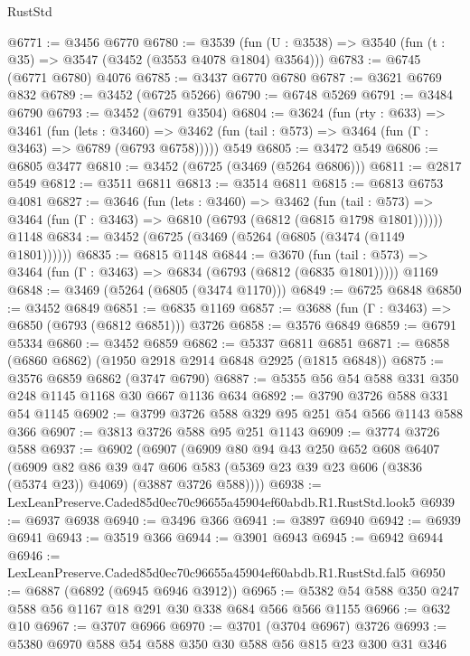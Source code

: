 \begin{lexlean}{RustStd}
\begin{coremodule}
@6771 := @3456 @6770
@6780 := @3539 (fun (U : @3538) => @3540 (fun (t : @35) => @3547 (@3452 (@3553 @4078 @1804) @3564)))
@6783 := @6745 (@6771 @6780) @4076
@6785 := @3437 @6770 @6780
@6787 := @3621 @6769 @832
@6789 := @3452 (@6725 @5266)
@6790 := @6748 @5269
@6791 := @3484 @6790
@6793 := @3452 (@6791 @3504)
@6804 := @3624
    (fun (rty : @633) =>
    @3461
      (fun (lets : @3460) =>
      @3462 (fun (tail : @573) => @3464 (fun (Γ : @3463) => @6789 (@6793 @6758)))))
    @549
@6805 := @3472 @549
@6806 := @6805 @3477
@6810 := @3452 (@6725 (@3469 (@5264 @6806)))
@6811 := @2817 @549
@6812 := @3511 @6811
@6813 := @3514 @6811
@6815 := @6813 @6753 @4081
@6827 := @3646
    (fun (lets : @3460) =>
    @3462
      (fun (tail : @573) => @3464 (fun (Γ : @3463) => @6810 (@6793 (@6812 (@6815 @1798 @1801))))))
    @1148
@6834 := @3452 (@6725 (@3469 (@5264 (@6805 (@3474 (@1149 @1801))))))
@6835 := @6815 @1148
@6844 := @3670
    (fun (tail : @573) => @3464 (fun (Γ : @3463) => @6834 (@6793 (@6812 (@6835 @1801)))))
    @1169
@6848 := @3469 (@5264 (@6805 (@3474 @1170)))
@6849 := @6725 @6848
@6850 := @3452 @6849
@6851 := @6835 @1169
@6857 := @3688 (fun (Γ : @3463) => @6850 (@6793 (@6812 @6851))) @3726
@6858 := @3576 @6849
@6859 := @6791 @5334
@6860 := @3452 @6859
@6862 := @5337 @6811 @6851
@6871 := @6858 (@6860 @6862) (@1950 @2918 @2914 @6848 @2925 (@1815 @6848))
@6875 := @3576 @6859 @6862 (@3747 @6790)
@6887 := @5355 @56 @54 @588 @331 @350 @248 @1145 @1168 @30 @667 @1136 @634
@6892 := @3790 @3726 @588 @331 @54 @1145
@6902 := @3799 @3726 @588 @329 @95 @251 @54 @566 @1143 @588 @366
@6907 := @3813 @3726 @588 @95 @251 @1143
@6909 := @3774 @3726 @588
@6937 := @6902
    (@6907
      (@6909
        @80
        @94
        @43
        @250
        @652
        @608
        @6407
        (@6909
          @82
          @86
          @39
          @47
          @606
          @583
          (@5369 @23 @39 @23 @606 (@3836 (@5374 @23)) @4069)
          (@3887 @3726 @588))))
@6938 := LexLeanPreserve.Caded85d0ec70c96655a45904ef60abdb.R1.RustStd.look5
@6939 := @6937 @6938
@6940 := @3496 @366
@6941 := @3897 @6940
@6942 := @6939 @6941
@6943 := @3519 @366
@6944 := @3901 @6943
@6945 := @6942 @6944
@6946 := LexLeanPreserve.Caded85d0ec70c96655a45904ef60abdb.R1.RustStd.fal5
@6950 := @6887 (@6892 (@6945 @6946 @3912))
@6965 := @5382 @54 @588 @350 @247 @588 @56 @1167 @18 @291 @30 @338 @684 @566 @566 @1155
@6966 := @632 @10
@6967 := @3707 @6966
@6970 := @3701 (@3704 @6967) @3726
@6993 := @5380
    @6970
    @588
    @54
    @588
    @350
    @30
    @588
    @56
    @815
    @23
    @300
    @31
    @346

\end{coremodule}
\end{lexlean}
